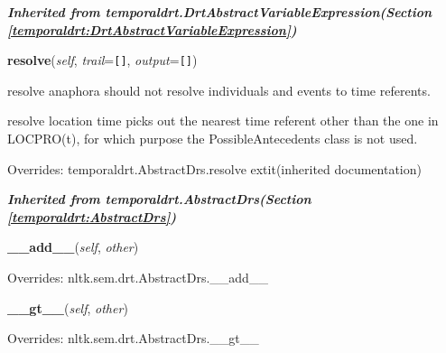 \large{\textbf{\textit{Inherited from temporaldrt.DrtAbstractVariableExpression\textit{(Section \ref{temporaldrt:DrtAbstractVariableExpression})}}}}

    \vspace{0.5ex}

\hspace{.8\funcindent}\begin{boxedminipage}{\funcwidth}

    \raggedright \textbf{resolve}(\textit{self}, \textit{trail}={\tt \texttt{[}\texttt{]}}, \textit{output}={\tt \texttt{[}\texttt{]}})

\setlength{\parskip}{2ex}
    resolve anaphora should not resolve individuals and events to time 
    referents.

    resolve location time picks out the nearest time referent other than 
    the one in LOCPRO(t), for which purpose the PossibleAntecedents class 
    is not used.

\setlength{\parskip}{1ex}
      Overrides: temporaldrt.AbstractDrs.resolve 	extit{(inherited documentation)}

    \end{boxedminipage}


\large{\textbf{\textit{Inherited from temporaldrt.AbstractDrs\textit{(Section \ref{temporaldrt:AbstractDrs})}}}}

    \vspace{0.5ex}

\hspace{.8\funcindent}\begin{boxedminipage}{\funcwidth}

    \raggedright \textbf{\_\_add\_\_}(\textit{self}, \textit{other})

\setlength{\parskip}{2ex}
\setlength{\parskip}{1ex}
      Overrides: nltk.sem.drt.AbstractDrs.\_\_add\_\_

    \end{boxedminipage}

    \vspace{0.5ex}

\hspace{.8\funcindent}\begin{boxedminipage}{\funcwidth}

    \raggedright \textbf{\_\_gt\_\_}(\textit{self}, \textit{other})

\setlength{\parskip}{2ex}
\setlength{\parskip}{1ex}
      Overrides: nltk.sem.drt.AbstractDrs.\_\_gt\_\_

    \end{boxedminipage}

